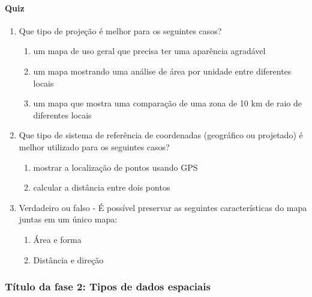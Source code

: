 \documentclass[
]{book}
\providecommand{\tightlist}{%
  \setlength{\itemsep}{0pt}\setlength{\parskip}{0pt}}
\begin{document}
\hypertarget{quiz}{%
\paragraph{Quiz}\label{quiz}}

\begin{enumerate}
\def\labelenumi{\arabic{enumi}.}
\tightlist
\item
  Que tipo de projeção é melhor para os seguintes casos?

  \begin{enumerate}
  \def\labelenumii{\arabic{enumii}.}
  \tightlist
  \item
    um mapa de uso geral que precisa ter uma aparência agradável
  \item
    um mapa mostrando uma análise de área por unidade entre diferentes locais
  \item
    um mapa que mostra uma comparação de uma zona de 10 km de raio de diferentes locais
  \end{enumerate}
\item
  Que tipo de sistema de referência de coordenadas (geográfico ou projetado) é melhor utilizado para os seguintes casos?

  \begin{enumerate}
  \def\labelenumii{\arabic{enumii}.}
  \setcounter{enumii}{3}
  \tightlist
  \item
    mostrar a localização de pontos usando GPS
  \item
    calcular a distância entre dois pontos
  \end{enumerate}
\item
  Verdadeiro ou falso - É possível preservar as seguintes características do mapa juntas em um único mapa:

  \begin{enumerate}
  \def\labelenumii{\arabic{enumii}.}
  \setcounter{enumii}{5}
  \tightlist
  \item
    Área e forma
  \item
    Distância e direção
  \end{enumerate}
\end{enumerate}

\hypertarget{tuxedtulo-da-fase-2-tipos-de-dados-espaciais}{%
\subsubsection{Título da fase 2: Tipos de dados espaciais}\label{tuxedtulo-da-fase-2-tipos-de-dados-espaciais}}
\end{document}
